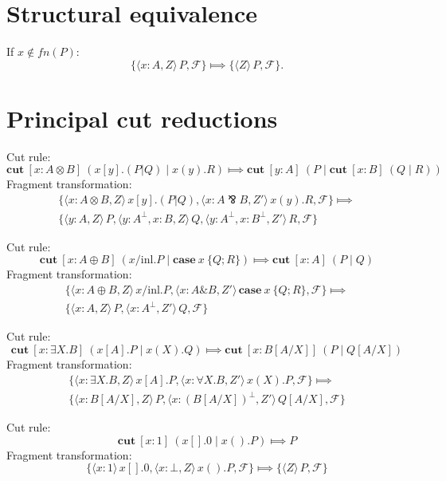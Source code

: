 \documentclass{article}
\newcommand{\cut}[4]{\mathbf{cut}\: [#1:#2] \: (#3 \mid #4)}
\newcommand{\case}[2]{\mathbf{case}\:#1\:\{#2\}}
\newcommand{\sel}[3]{#1/\mathrm{#2}.#3}
\newcommand{\fragment}[2]{\langle #1 \rangle \, #2}
\def\tensor{\otimes}
\def\parr{\bindnasrepma}
\def\with{\&}
\def\goesto{\Longmapsto}
\def\F{\mathcal{F}}
\begin{document}
\section{Structural equivalence}

If $x \not\in fn(P)$:
\[ \{ \fragment{x:A,Z}{P}, \F \} \goesto \{ \fragment{Z}{P}, \F \}. \]

\section{Principal cut reductions}

Cut rule:
\[ \cut{x}{A \tensor B}{x[y].(P|Q)}{x(y).R} \goesto \cut{y}{A}{P}{\cut{x}{B}{Q}{R}} \]
Fragment transformation:
\begin{multline*}
 \{\fragment{x:A \tensor B,Z}{x[y].(P|Q)}, \fragment{x:A \parr B,Z'}{x(y).R}, \F \} \goesto \\
 \{\fragment{y:A,Z}{P}, \fragment{y:A^\perp,x:B,Z}{Q}, \fragment{y:A^\perp,x:B^\perp,Z'}{R}, \F \}
\end{multline*}

\noindent
Cut rule:
\[ \cut{x}{A \oplus B}{\sel{x}{inl}{P}}{\case{x}{Q;R}} \goesto \cut{x}{A}{P}{Q} \]
Fragment transformation:
\begin{multline*}
  \{\fragment{x:A \oplus B,Z}{\sel{x}{inl}{P}}, \fragment{x:A \with B,Z'}{\case{x}{Q;R}},\F\} \goesto \\
  \{\fragment{x:A,Z}{P}, \fragment{x:A^\perp,Z'}{Q},\F\}
\end{multline*}

\noindent
Cut rule:
\[ \cut{x}{\exists X.B}{x[A].P}{x(X).Q} \goesto \cut{x}{B[A/X]}{P}{Q[A/X]} \]
Fragment transformation:
\begin{multline*}
  \{\fragment{x:\exists X.B,Z}{x[A].P}, \fragment{x:\forall X.B,Z'}{x(X).P}, \F \} \goesto \\
  \{\fragment{x:B[A/X],Z}{P}, \fragment{x:(B[A/X])^\perp,Z'}{Q[A/X]}, \F\}
\end{multline*}

\noindent
Cut rule:
\[ \cut{x}{1}{x[].0}{x().P} \goesto P \]
Fragment transformation:
\[ \{ \fragment{x:1}{x[].0}, \fragment{x:\bot,Z}{x().P}, \F \} \goesto \{ \fragment{Z}{P}, \F \} \]
\end{document}
